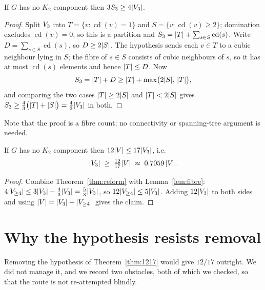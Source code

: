 \documentclass[11pt,a4paper]{article}
\begin{document}
\begin{lemma}\label{lem:fibre}
If $G$ has no $K_2$ component then $3 S_3 \ge 4\lvert V_{3} \rvert$.
\end{lemma}

\begin{proof}
Split $V_{3}$ into $T = \{v : \operatorname{cd}(v) = 1\}$ and
$S = \{v : \operatorname{cd}(v) \ge 2\}$; domination excludes $\operatorname{cd}(v) = 0$,
so this is a partition and $S_3 = \lvert T \rvert + \sum_{s \in S}\operatorname{cd}(s)$. Write
$D = \sum_{s\in S}\operatorname{cd}(s)$, so $D \ge 2\lvert S \rvert$. The hypothesis sends each
$v \in T$ to a cubic neighbour lying in $S$; the fibre of $s \in S$ consists of cubic
neighbours of $s$, so it has at most $\operatorname{cd}(s)$ elements and hence
$\lvert T \rvert \le D$. Now
\[
  S_3 = \lvert T \rvert + D \ge \lvert T \rvert + \max\bigl(2\lvert S \rvert,\, \lvert T \rvert\bigr),
\]
and comparing the two cases $\lvert T \rvert \ge 2\lvert S \rvert$ and $\lvert T \rvert < 2\lvert S \rvert$ gives
$S_3 \ge \tfrac{4}{3}\bigl(\lvert T \rvert + \lvert S \rvert\bigr) = \tfrac{4}{3}\lvert V_{3} \rvert$
in both.
\end{proof}

Note that the proof is a fibre count; no connectivity or spanning-tree argument is needed.

\begin{theorem}\label{thm:1217}
If $G$ has no $K_2$ component then $12\lvert V \rvert \le 17\lvert V_{3} \rvert$, i.e.
\[
  \lvert V_{3} \rvert \;\ge\; \tfrac{12}{17}\lvert V \rvert \;\approx\; 0.7059\,\lvert V \rvert.
\]
\end{theorem}

\begin{proof}
Combine Theorem~\ref{thm:reform} with Lemma~\ref{lem:fibre}:
$4\lvert V_{\ge 4} \rvert \le 3\lvert V_{3} \rvert - \tfrac{4}{3}\lvert V_{3} \rvert = \tfrac{5}{3}\lvert V_{3} \rvert$,
so $12\lvert V_{\ge 4} \rvert \le 5\lvert V_{3} \rvert$. Adding $12\lvert V_{3} \rvert$ to both sides and
using $\lvert V \rvert = \lvert V_{3} \rvert + \lvert V_{\ge 4} \rvert$ gives the claim.
\end{proof}

\section{Why the hypothesis resists removal}\label{sec:obstruction}

Removing the hypothesis of Theorem~\ref{thm:1217} would give $12/17$ outright. We did not
manage it, and we record two obstacles, both of which we checked, so that the route is not
re-attempted blindly.
\end{document}
